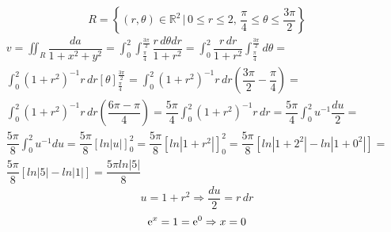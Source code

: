 \begin{enumerate}
	\begin{equation*}
		R = \left\{(r, \theta) \in \mathbb{R}^2 \,|\, 0 \leq r \leq 2,\, \dfrac{\pi}{4} \leq \theta \leq \dfrac{3\pi}{2} \right\}
	\end{equation*}
	\begin{gather*}
		v = \iint_R \dfrac{da}{1 + x^2 + y^2} = \int_0^2 \int_{\frac{\pi}{4}}^{\frac{3\pi}{2}} \dfrac{r\, d\theta dr}{1 + r^2} = \int_0^2 \dfrac{r\, dr}{1 + r^2} \int_{\frac{\pi}{4}}^{\frac{3\pi}{2}} d\theta =\\ \int_0^2 \left(1 + r^2\right)^{-1} r\, dr \left[\theta\right]_{\frac{\pi}{4}}^{\frac{3\pi}{2}} = \int_0^2 \left(1 + r^2\right)^{-1} r\, dr \left(\dfrac{3\pi}{2} - \dfrac{\pi}{4}\right) =\\ \int_0^2 \left(1 + r^2\right)^{-1} r\, dr\left(\dfrac{6\pi - \pi}{4}\right) = \dfrac{5\pi}{4}\int_0^2 \left(1 + r^2\right)^{-1} r\, dr = \dfrac{5\pi}{4}\int_0^2 u^{-1} \dfrac{du}{2} =\\ \dfrac{5\pi}{8}\int_0^2 u^{-1} du = \dfrac{5\pi}{8}\left[ln |u|\right]_0^2 = \dfrac{5\pi}{8}\left[ln |1 + r^2|\right]_0^2 = \dfrac{5\pi}{8}\left[ln |1 + 2^2| - ln |1 + 0^2|\right] =\\ \dfrac{5\pi}{8}\left[ln |5| - ln |1|\right] = \dfrac{5\pi ln |5|}{8}
	\end{gather*}
	\begin{equation*}
		u = 1 + r^2 \Rightarrow \dfrac{du}{2} = r\,dr
	\end{equation*}
	\begin{equation*}
		\operatorname{e}^x = 1 = \operatorname{e}^0 \Rightarrow x = 0
	\end{equation*}
\end{enumerate}

